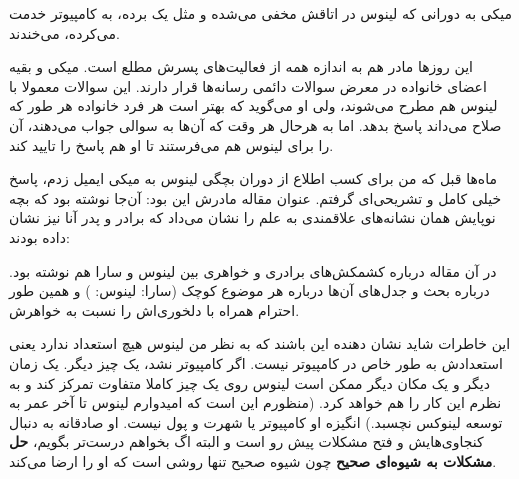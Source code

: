 \begin{journal}
میکی به دورانی که لینوس در اتاقش مخفی می‌شده و مثل یک برده، به کامپیوتر
خدمت می‌کرده، می‌خندند. 

این روزها مادر هم به اندازه همه از فعالیت‌های پسرش مطلع است. میکی و
بقیه اعضای خانواده در معرض سوالات دائمی رسانه‌ها قرار دارند. این سوالات
معمولا با لینوس هم مطرح می‌شوند، ولی او می‌گوید که بهتر است هر فرد
خانواده هر طور که صلاح می‌داند پاسخ بدهد. اما به هرحال هر وقت که آن‌ها
به سوالی جواب می‌دهند، آن را برای لینوس هم می‌فرستند تا او هم پاسخ را
تایید کند.

ماه‌ها قبل که من برای کسب اطلاع از دوران بچگی لینوس به میکی ایمیل زدم،
پاسخ خیلی کامل و تشریحی‌ای گرفتم. عنوان مقاله‌ مادرش این بود:
 آن‌جا نوشته بود
که بچه‌ نوپایش همان نشانه‌های علاقمندی به علم را نشان می‌داد که برادر و
پدر آنا نیز نشان داده بودند:


در آن مقاله درباره کشمکش‌های برادری و خواهری بین لینوس و سارا هم نوشته
بود. درباره بحث و جدل‌های آن‌ها درباره هر موضوع کوچک (سارا:  لینوس: ) و همین طور احترام همراه با دلخوری‌اش را نسبت به
خواهرش. 

این خاطرات شاید نشان دهنده‌ این باشند که به نظر من لینوس هیچ استعداد
 ندارد یعنی استعدادش به طور خاص در کامپیوتر نیست. اگر کامپیوتر
نشد، یک چیز دیگر. یک زمان دیگر و یک مکان دیگر ممکن است لینوس روی یک
چیز کاملا متفاوت تمرکز کند و به نظرم این کار را هم خواهد کرد. (منظورم
این است که امیدوارم لینوس تا آخر عمر به توسعه لینوکس نچسبد.) انگیزه او
کامپیوتر یا شهرت و پول نیست. او صادقانه به دنبال کنجاوی‌هایش و فتح
مشکلات پیش رو است و البته اگ بخواهم درست‌تر بگویم، \textbf{حل مشکلات به
شیوه‌ای صحیح} چون شیوه صحیح تنها روشی است که او را ارضا می‌کند.


\end{journal}
